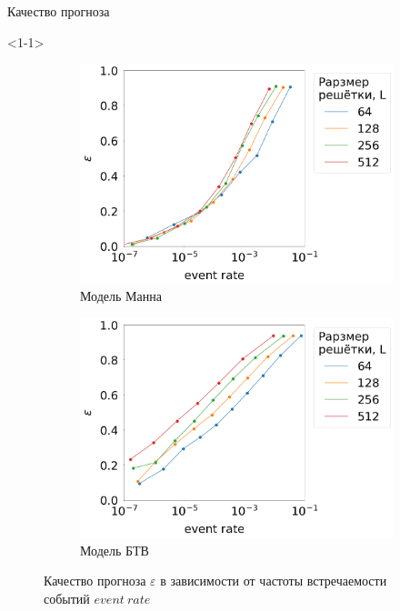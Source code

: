 \documentclass{beamer}
\begin{document}
	\begin{frame}{Качество прогноза}
		\begin{onlyenv}
		\begin{figure}[h]
			\centering
			\begin{subfigure}[t]{0.45\textwidth}
				\centering
				\includegraphics[width=\textwidth]{images/eps_vs_event_rate_manna}
				\caption{Модель Манна}
				\label{pic:event_rate_manna}
			\end{subfigure}
			\begin{subfigure}[t]{0.45\textwidth}
				\centering
				\includegraphics[width=\textwidth]{images/eps_vs_event_rate_btw}
				\caption{Модель БТВ}
				\label{pic:event_rate_btw}
			\end{subfigure}
			\caption*{Качество прогноза $\varepsilon$ в зависимости от частоты встречаемости событий $event\ rate$}\label{pic:event_rate}
		\end{figure}
		\end{onlyenv}
	

\end{frame}
\end{document}
